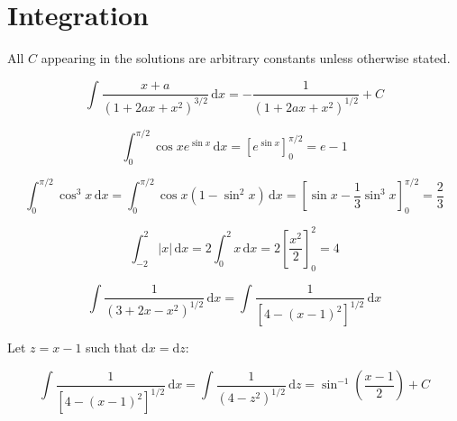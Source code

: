 \documentclass[12pt]{article}
\begin{document}



\pagebreak
\section*{Integration}


All $C$ appearing in the solutions are arbitrary constants unless otherwise stated.



\begin{equation}
    \int \frac{x + a}{(1 + 2ax + x^{2})^{3/2}} \, \mathrm{d}x = -\frac{1}{(1 + 2ax + x^{2})^{1/2}} + C
\end{equation}


\begin{equation}
    \int_{0}^{\pi/2} \cos{x} e^{\sin{x}} \, \mathrm{d}x = \left[ e^{\sin{x}} \right]_{0}^{\pi/2} = e - 1
\end{equation}


\begin{equation}
    \int_{0}^{\pi/2} \cos^{3}{x} \, \mathrm{d}x = \int_{0}^{\pi/2} \cos{x} (1 - \sin^{2}{x}) \, \mathrm{d}x = \left[ \sin{x} - \frac{1}{3} \sin^{3}{x} \right]_{0}^{\pi/2} = \frac{2}{3}
\end{equation}


\begin{equation}
    \int_{-2}^{2} \left\lvert x \right\rvert \, \mathrm{d}x = 2 \int_{0}^{2} x \, \mathrm{d}x = 2 \left[ \frac{x^{2}}{2} \right]_{0}^{2} = 4
\end{equation}



\begin{equation}
    \int \frac{1}{(3 + 2x - x^{2})^{1/2}} \, \mathrm{d}x = \int \frac{1}{\left[ 4 - (x - 1)^{2} \right]^{1/2}} \, \mathrm{d}x
\end{equation}

Let $z = x - 1$ such that $\mathrm{d}x = \mathrm{d}z$:

\begin{equation}
    \int \frac{1}{\left[ 4 - (x - 1)^{2} \right]^{1/2}} \, \mathrm{d}x = \int \frac{1}{\left( 4 - z^{2} \right)^{1/2}} \, \mathrm{d}z = \sin^{-1}{\left( \frac{x - 1}{2} \right)} + C
\end{equation}
\end{document}

